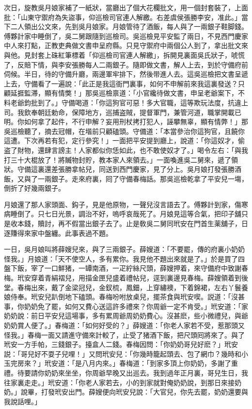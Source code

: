 次日，旋教吳月娘家補了一紙狀，當廳出了個大花欄批文，用一個封套裝了，上面批：「山東守禦府為失盜事，仰巡檢司官連人解繳。右差虞侯張勝李安，准此。」當下二人領出公文來，先到吳月娘家。月娘管待了酒飯，每人與了一兩銀子鞋脚錢。傅夥計家中睡倒了，吳二舅跟隨到巡檢司。吳巡檢見平安監了兩日，不見西門慶家中人來打點，正教吏典做文書申呈府縣。只見守禦府中兩個公人到了，拿出批文來與他。見封套上硃紅筆標着「仰巡檢司官連人解繳」，拆開見裏面吳氏狀子，唬慌了，反賠下情，與李安張勝每人二兩銀子。隨即做文書，解人上去，到於守備府前伺候。半日，待的守備升廳，兩邊軍牢排下，然後带進人去。這吳巡檢把文書呈遞上去，守備看了一遍說：「此正是我這衙門裏事，如何不申解前來我這裏發送？只顧延捱監滞，顯有情獘！」那吳巡檢禀道：「小官纔待做文書，申呈老爺案下，不料老爺鈞批到了。」守備喝道：「你這狗官可惡！多大官職，這等欺玩法度，抗違上司。我欽奉朝廷勅命，保障地方，巡捕盗賊，提督軍門，兼管河道，職掌開載已明。你如何拿了起件，不行申解？妄用刑杖拷打犯人，誣攀無辜，顯有情弊！」那吳巡檢聽了，摘去冠帽，在堦前只顧磕頭。守備道：「本當參治你這狗官，且饒你這遭。下次再若有犯，定行參究！」一面把平安提到廳上，說道：「你這奴才，偷盗了財物，還肆言謗主！人家都似你恁如此，也不敢使奴才了。」喝令左右：「與我打三十大棍放了！將贓物封貯，教本家人來領去。」一面喚進吳二舅來，遞了領狀。守備這裏還差張勝拿帖兒，同送到西門慶家，見了分上。吳月娘打發張勝酒飯，又與了一兩銀子。走來府裏，囘了守備春梅話。那吳巡檢乾拿了平安兒一塲，倒折了好幾兩銀子。

月娘還了那人家頭面、鈎子，見是他原物，一聲兒沒言語去了。傅夥計到家，傷寒病睡倒了。只七日光景，調治不好，嗚呼哀哉死了。月娘見這等合氣，把印子舖只是收本錢，贖討，再不假當出銀子去了。止是敎吳二舅同玳安在門首生薬舖子，日逐賺得來家中盤纏。此事表過不題。

一日，吳月娘叫將薛嫂兒來，與了三兩銀子。薛嫂道：「不要罷，傳的府裏小奶奶怪我。」月娘道：「天不使空人，多有累你。我見他不題出來就是了。」於是買了四盤下飯，宰了一口鮮猪，一罈南酒，一疋紵絲尺頭，薛嫂押着，來守備府中致謝春梅。玳安穿着青絹褶兒，用描金匣兒盛着禮帖兒，逕到裏邊見春梅。薛嫂領着到後堂。春梅出來，戴了金梁冠兒，金釵梳，鳳鈿，上穿繡襖，下着錦裙，左右丫鬟養娘侍奉。玳安兒趴倒地下磕頭。春梅吩咐放桌兒，擺茶食與玳安喫。説道：「沒甚事，你奶奶免了罷，如何又費心送這許多禮來？你周爺一定不肯受。」玳安道：「家奶奶說：前日平安兒這場事，多有累周爺周奶奶費心。沒甚麽，些小微禮兒，與爺奶奶賞人便了。」春梅道：「如何好受的？」薛嫂道：「你老人家若不受，惹那頭又怪我。」春梅一面又請進守備來計較了，止受了猪酒下飯，把尺頭囘將來了。與了玳安一方手帕，三錢銀子。擡盒人二錢。春梅因問：「你奶奶哥兒好麽？」玳安説：「哥兒好不耍子兒哩！」又問玳安兒：「你幾時籠起頭去、包了網巾？幾時和小玉完房來？」玳安道：「是八月内來。」春梅道：「到家多頂上你奶奶，多謝了重禮。待要請你奶奶來坐坐，你周爺早晚又出巡去。我到過年正月裏，哥兒生日，我往家裏走走。」玳安道：「你老人家若去，小的到家就對俺奶奶說，到那日來接奶奶。」說畢，打發玳安出門。薛嫂便向玳安兒說：「大官兒，你先去罷，奶奶還要與我說話哩。」

